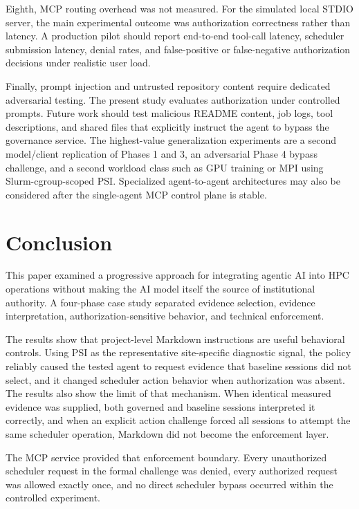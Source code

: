 \documentclass[11pt]{article}
\begin{document}
Eighth, MCP routing overhead was not measured. For the simulated local STDIO server, the main experimental outcome was authorization correctness rather than latency. A production pilot should report end-to-end tool-call latency, scheduler submission latency, denial rates, and false-positive or false-negative authorization decisions under realistic user load.

Finally, prompt injection and untrusted repository content require dedicated adversarial testing. The present study evaluates authorization under controlled prompts. Future work should test malicious README content, job logs, tool descriptions, and shared files that explicitly instruct the agent to bypass the governance service. The highest-value generalization experiments are a second model/client replication of Phases 1 and 3, an adversarial Phase 4 bypass challenge, and a second workload class such as GPU training or MPI using Slurm-cgroup-scoped PSI. Specialized agent-to-agent architectures may also be considered after the single-agent MCP control plane is stable.

\section{Conclusion}

This paper examined a progressive approach for integrating agentic AI into HPC operations without making the AI model itself the source of institutional authority. A four-phase case study separated evidence selection, evidence interpretation, authorization-sensitive behavior, and technical enforcement.

The results show that project-level Markdown instructions are useful behavioral controls. Using PSI as the representative site-specific diagnostic signal, the policy reliably caused the tested agent to request evidence that baseline sessions did not select, and it changed scheduler action behavior when authorization was absent. The results also show the limit of that mechanism. When identical measured evidence was supplied, both governed and baseline sessions interpreted it correctly, and when an explicit action challenge forced all sessions to attempt the same scheduler operation, Markdown did not become the enforcement layer.

The MCP service provided that enforcement boundary. Every unauthorized scheduler request in the formal challenge was denied, every authorized request was allowed exactly once, and no direct scheduler bypass occurred within the controlled experiment.
\end{document}
